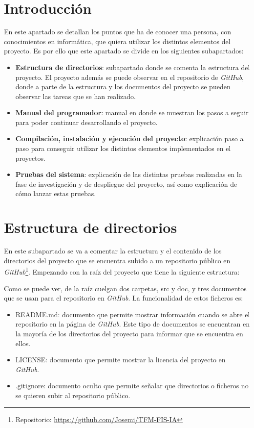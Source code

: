 
\section{Introducción}
En este apartado se detallan los puntos que ha de conocer una persona, con conocimientos en informática, que quiera utilizar los distintos elementos del proyecto. Es por ello que este apartado se divide en los siguientes subapartados:
\begin{itemize}
	\item \textbf{Estructura de directorios}: subapartado donde se comenta la estructura del proyecto. El proyecto además se puede observar en el repositorio de \textit{GitHub}, donde a parte de la estructura y los documentos del proyecto se pueden observar las tareas que se han realizado.
	\item \textbf{Manual del programador}: manual en donde se muestran los pasos a seguir para poder continuar desarrollando el proyecto.
	\item \textbf{Compilación, instalación y ejecución del proyecto}: explicación paso a paso para conseguir utilizar los distintos elementos implementados en el proyectos.
	\item \textbf{Pruebas del sistema}: explicación de las distintas pruebas realizadas en la fase de investigación y de despliegue del proyecto, así como explicación de cómo lanzar estas pruebas.
\end{itemize}
\section{Estructura de directorios}
En este subapartado se va a comentar la estructura y el contenido de los directorios del proyecto que se encuentra subido a un repositorio público en \textit{GitHub}\footnote{Repositorio: \href{https://github.com/Josemi/TFM-FIS-IA}{https://github.com/Josemi/TFM-FIS-IA}}. Empezando con la raíz del proyecto que tiene la siguiente estructura:

Como se puede ver, de la raíz cuelgan dos carpetas, src y doc, y tres documentos que se usan para el repositorio en \textit{GitHub}. La funcionalidad de estos ficheros es:
\begin{itemize}
	\item README.md: documento que permite mostrar información cuando se abre el repositorio en la página de \textit{GitHub}. Este tipo de documentos se encuentran en la mayoría de los directorios del proyecto para informar que se encuentra en ellos.
	\item LICENSE: documento que permite mostrar la licencia del proyecto en \textit{GitHub}.
	\item .gitignore: documento oculto que permite señalar que directorios o ficheros no se quieren subir al repositorio público.
\end{itemize}

